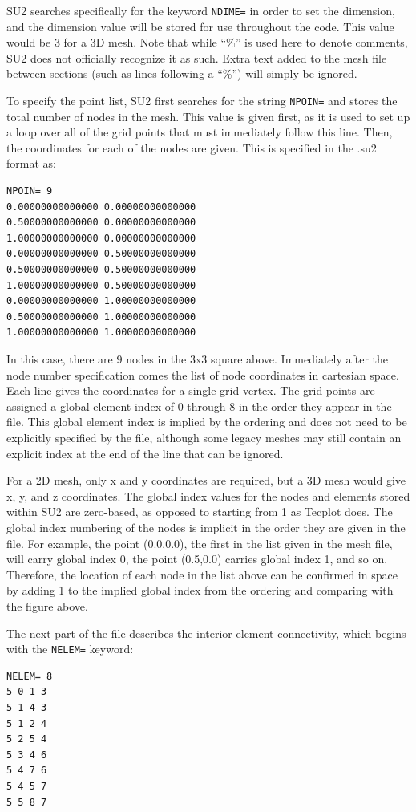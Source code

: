 \documentclass{article}
\begin{document}
SU2 searches specifically for the keyword \verb|NDIME=| in order to set the dimension, and the dimension value will be stored for use throughout the code. This value would be 3 for a 3D mesh. Note that while “\%” is used here to denote comments, SU2 does not officially recognize it as such. Extra text added to the mesh file between sections (such as lines following a “\%”) will simply be ignored.

To specify the point list, SU2 first searches for the string \verb|NPOIN=| and stores the total number of nodes in the mesh. This value is given first, as it is used to set up a loop over all of the grid points that must immediately follow this line. Then, the coordinates for each of the nodes are given. This is specified in the .su2 format as:

\begin{lstlisting}
NPOIN= 9
0.00000000000000 0.00000000000000
0.50000000000000 0.00000000000000
1.00000000000000 0.00000000000000
0.00000000000000 0.50000000000000
0.50000000000000 0.50000000000000
1.00000000000000 0.50000000000000
0.00000000000000 1.00000000000000
0.50000000000000 1.00000000000000
1.00000000000000 1.00000000000000
\end{lstlisting}


In this case, there are 9 nodes in the 3x3 square above. Immediately after the node number specification comes the list of node coordinates in cartesian space. Each line gives the coordinates for a single grid vertex. The grid points are assigned a global element index of 0 through 8 in the order they appear in the file. This global element index is implied by the ordering and does not need to be explicitly specified by the file, although some legacy meshes may still contain an explicit index at the end of the line that can be ignored.

For a 2D mesh, only x and y coordinates are required, but a 3D mesh would give x, y, and z coordinates. The global index values for the nodes and elements stored within SU2 are zero-based, as opposed to starting from 1 as Tecplot does. The global index numbering of the nodes is implicit in the order they are given in the file. For example, the point (0.0,0.0), the first in the list given in the mesh file, will carry global index 0, the point (0.5,0.0) carries global index 1, and so on. Therefore, the location of each node in the list above can be confirmed in space by adding 1 to the implied global index from the ordering and comparing with the figure above.

The next part of the file describes the interior element connectivity, which begins with the \verb|NELEM=| keyword:
\begin{lstlisting}
NELEM= 8
5 0 1 3
5 1 4 3
5 1 2 4
5 2 5 4
5 3 4 6
5 4 7 6
5 4 5 7
5 5 8 7
\end{lstlisting}
\end{document}
